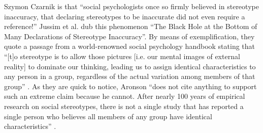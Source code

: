 \begin{artengenv}{Szymon Czarnik}
{%
 is that ``social psychologists once so firmly believed in stereotype inaccuracy, that declaring stereotypes to be inaccurate did not even require a reference!'' \parencite[][p.33]{jussim_stereotype_2016}} Jussim et al. 
\parencite*[][p.32]{jussim_stereotype_2016} %
 dub this phenomenon ``The Black Hole at the Bottom of Many Declarations of Stereotype Inaccuracy''. By means of exemplification, they quote a passage from a world-renowned social psychology handbook stating that ``[t]o stereotype is to allow those pictures [i.e. our mental images of external reality] to dominate our thinking, leading us to assign identical characteristics to any person in a group, regardless of the actual variation among members of that group'' 
\parencite[][p.309]{aronson_social_2011}. %
 As they are quick to notice, Aronson ``does not cite anything to support such an extreme claim because he cannot. After nearly 100 years of empirical research on social stereotypes, there is not a single study that has reported a single person who believes all members of any group have identical characteristics'' 
\parencite[][p.33]{jussim_stereotype_2016}.%


\end{artengenv}
